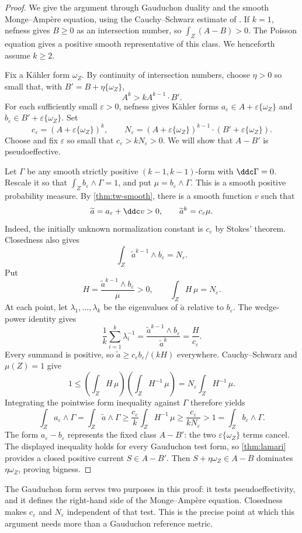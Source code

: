 \begin{proof}
We give the argument through Gauduchon duality and the smooth
Monge--Amp\`ere equation, using the Cauchy--Schwarz estimate of \cite[Lemma~3.2]{Pop16}.
If $k=1$, nefness gives $B\geq0$ as an intersection number, so
$\int_Z(A-B)>0$. The Poisson equation gives a positive smooth
representative of this class. We henceforth assume $k\geq2$.

Fix a K\"ahler form $\omega_Z$. By continuity of intersection numbers,
choose $\eta>0$ so small that, with $B'=B+\eta\{\omega_Z\}$,
\[
 A^k>kA^{k-1}\cdot B'.
\]
For each sufficiently small $\varepsilon>0$, nefness gives K\"ahler
forms $a_\varepsilon\in A+\varepsilon\{\omega_Z\}$ and
$b_\varepsilon\in B'+\varepsilon\{\omega_Z\}$. Set
\[
 c_\varepsilon=(A+\varepsilon\{\omega_Z\})^k,
 \qquad
 N_\varepsilon=(A+\varepsilon\{\omega_Z\})^{k-1}
                    \cdot(B'+\varepsilon\{\omega_Z\}).
\]
Choose and fix $\varepsilon$ so small that
$c_\varepsilon>kN_\varepsilon>0$.
We will show that $A-B'$ is pseudoeffective.

Let $\Gamma$ be any smooth strictly positive $(k-1,k-1)$-form with
$\ddc\Gamma=0$. Rescale it so that
$\int_Z b_\varepsilon\wedge\Gamma=1$, and put
$\mu=b_\varepsilon\wedge\Gamma$. This is a smooth positive probability
measure. By \cref{thm:tw-smooth}, there is a smooth function $v$ such that
\[
 \widetilde a=a_\varepsilon+\ddc v>0,
 \qquad \widetilde a^k=c_\varepsilon\mu.
\]
Indeed, the initially unknown normalization constant is
$c_\varepsilon$ by Stokes' theorem. Closedness also gives
\[
 \int_Z\widetilde a^{k-1}\wedge b_\varepsilon=N_\varepsilon.
\]
Put
\[
 H=\frac{\widetilde a^{k-1}\wedge b_\varepsilon}{\mu}>0,
 \qquad \int_ZH\,\mu=N_\varepsilon.
\]
At each point, let $\lambda_1,\ldots,\lambda_k$ be the eigenvalues
of $\widetilde a$ relative to $b_\varepsilon$. The wedge-power identity gives
\[
 \frac1k\sum_{i=1}^k\lambda_i^{-1}
 =\frac{\widetilde a^{k-1}\wedge b_\varepsilon}{\widetilde a^k}
 =\frac{H}{c_\varepsilon}.
\]
Every summand is positive, so
$\widetilde a\geq c_\varepsilon b_\varepsilon/(kH)$ everywhere.
Cauchy--Schwarz and $\mu(Z)=1$ give
\[
 1\leq\left(\int_ZH\,\mu\right)
         \left(\int_ZH^{-1}\,\mu\right)
   =N_\varepsilon\int_ZH^{-1}\,\mu.
\]
Integrating the pointwise form inequality against $\Gamma$ therefore yields
\[
 \int_Za_\varepsilon\wedge\Gamma
 =\int_Z\widetilde a\wedge\Gamma
 \geq\frac{c_\varepsilon}{k}\int_ZH^{-1}\,\mu
 \geq\frac{c_\varepsilon}{kN_\varepsilon}>1
 =\int_Zb_\varepsilon\wedge\Gamma.
\]
The form $a_\varepsilon-b_\varepsilon$ represents the fixed class
$A-B'$: the two $\varepsilon\{\omega_Z\}$ terms cancel. The displayed
inequality holds for every Gauduchon test form, so \cref{thm:lamari}
provides a closed positive current $S\in A-B'$. Then
$S+\eta\omega_Z\in A-B$ dominates $\eta\omega_Z$, proving bigness.
\end{proof}

The Gauduchon form serves two purposes in this proof: it tests
pseudoeffectivity, and it defines the right-hand side of the
Monge--Amp\`ere equation. Closedness makes $c_\varepsilon$ and
$N_\varepsilon$ independent of that test. This is the precise point
at which this argument needs more than a Gauduchon reference metric.
